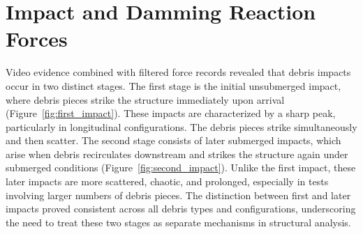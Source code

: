 \documentclass{article}
\begin{document}
\section{Impact and Damming Reaction Forces}
Video evidence combined with filtered force records revealed that debris impacts occur in two distinct stages. The first stage is the initial unsubmerged impact, where debris pieces strike the structure immediately upon arrival (Figure~\ref{fig:first_impact}). These impacts are characterized by a sharp peak, particularly in longitudinal configurations. The debris pieces strike simultaneously and then scatter. The second stage consists of later submerged impacts, which arise when debris recirculates downstream and strikes the structure again under submerged conditions (Figure~\ref{fig:second_impact}). Unlike the first impact, these later impacts are more scattered, chaotic, and prolonged, especially in tests involving larger numbers of debris pieces. The distinction between first and later impacts proved consistent across all debris types and configurations, underscoring the need to treat these two stages as separate mechanisms in structural analysis.
\end{document}
